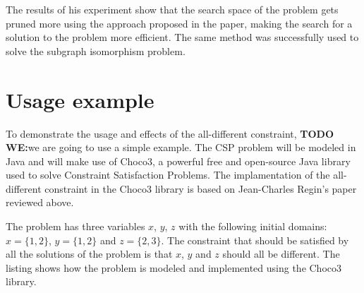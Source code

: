 \documentclass{l4proj}
\begin{document}
\noindent The results of his experiment show that the search space of the problem gets pruned more using the approach proposed in the paper, making the search for a solution to the problem more efficient. The same method was successfully used to solve the subgraph isomorphism problem. 

\section{Usage example}
\noindent To demonstrate the usage and effects of the all-different constraint, \textbf{TODO WE:}we are going to use a simple example. The CSP problem will be modeled in Java and will make use of Choco3, a powerful free and open-source Java library used to solve Constraint Satisfaction Problems. The implamentation of the all-different constraint in the Choco3 library is based on Jean-Charles Regin's paper\cite{regin1994filtering} reviewed above.

\noindent The problem has three variables $x$, $y$, $z$ with the following initial domains: $x = \{1, 2\}$, $y = \{1, 2\}$ and $z = \{2, 3\}$. The constraint that should be satisfied by all the solutions of the problem is that $x$, $y$ and $z$ should all be different. The listing  shows how the problem is modeled and implemented using the Choco3 library.


\end{document}
